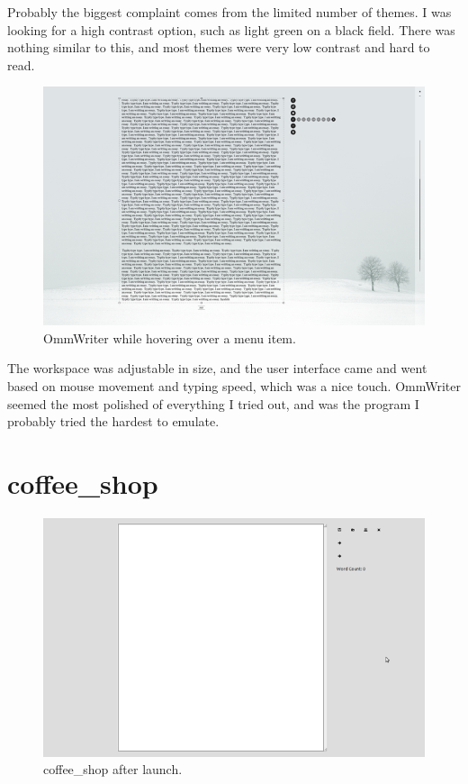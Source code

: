 \documentclass[10pt]{article}
\begin{document}
Probably the biggest complaint comes from the limited number of themes. I was looking for a high contrast option, such as light green on a black field. There was nothing similar to this, and most themes were very low contrast and hard to read.

\begin{figure}
   \centering
      \includegraphics[width=130mm]{images/ommwriter3.png}
   \caption{OmmWriter while hovering over a menu item.}
\end{figure}

The workspace was adjustable in size, and the user interface came and went based on mouse movement and typing speed, which was a nice touch. OmmWriter seemed the most polished of everything I tried out, and was the program I probably tried the hardest to emulate.

\section{coffee\_shop}

\begin{figure}
   \centering
      \includegraphics[width=130mm]{images/coffee_shop1.png}
   \caption{coffee\_shop after launch.}
\end{figure}
\end{document}
